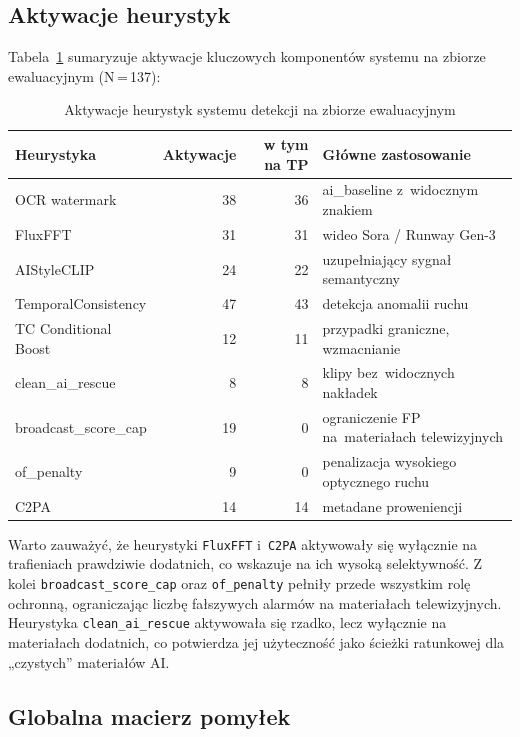 \subsection*{Aktywacje heurystyk}

Tabela~\ref{tab:heuristics} sumaryzuje aktywacje kluczowych komponentów systemu
na zbiorze ewaluacyjnym (N\,=\,137):

\begin{table}[h]
\centering
\caption{Aktywacje heurystyk systemu detekcji na zbiorze ewaluacyjnym}
\label{tab:heuristics}
\begin{tabular}{lrrl}
\toprule
Heurystyka & Aktywacje & w tym na TP & Główne zastosowanie \\
\midrule
OCR watermark & 38 & 36 & ai\_baseline z~widocznym znakiem \\
FluxFFT & 31 & 31 & wideo Sora / Runway Gen-3 \\
AIStyleCLIP & 24 & 22 & uzupełniający sygnał semantyczny \\
TemporalConsistency & 47 & 43 & detekcja anomalii ruchu \\
TC Conditional Boost & 12 & 11 & przypadki graniczne, wzmacnianie \\
clean\_ai\_rescue & 8 & 8 & klipy bez~widocznych nakładek \\
broadcast\_score\_cap & 19 & 0 & ograniczenie FP na~materiałach telewizyjnych \\
of\_penalty & 9 & 0 & penalizacja wysokiego optycznego ruchu \\
C2PA & 14 & 14 & metadane proweniencji \\
\bottomrule
\end{tabular}
\end{table}

Warto zauważyć, że heurystyki \texttt{FluxFFT} i~\texttt{C2PA} aktywowały się wyłącznie
na trafieniach prawdziwie dodatnich, co wskazuje na ich wysoką selektywność.
Z kolei \texttt{broadcast\_score\_cap} oraz \texttt{of\_penalty} pełniły przede wszystkim rolę ochronną,
ograniczając liczbę fałszywych alarmów na materiałach telewizyjnych.
Heurystyka \texttt{clean\_ai\_rescue} aktywowała się rzadko, lecz wyłącznie na materiałach dodatnich,
co potwierdza jej użyteczność jako ścieżki ratunkowej dla „czystych” materiałów AI.

\subsection*{Globalna macierz pomyłek}

